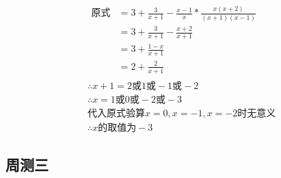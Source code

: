 \documentclass[answers]{exam} %
\begin{document}
\begin{questions}
\begin{parts}
    \vspace*{1in}
    \begin{solution}
      \[
        \begin{aligned}
        & \begin{aligned}
          \mbox{原式} &= 3 + \frac{3}{x+1} - \frac{x-1}{x} * \frac{x(x+2)}{(x+1)(x-1)} \\
          &= 3 + \frac{3}{x+1} - \frac{x+2}{x+1} \\
          &= 3 + \frac{1-x}{x+1} \\
          &= 2 + \frac{2}{x+1}
        \end{aligned} \\
        & \therefore x + 1 = 2 \mbox{或} 1 \mbox{或} -1 \mbox{或} -2 \\
        & \therefore x = 1 \mbox{或} 0 \mbox{或} -2 \mbox{或} -3 \\
        & \mbox{代入原式验算} x = 0, x = -1, x = -2 \mbox{时无意义} \\
        & \therefore x \mbox{的取值为} -3
        \end{aligned}
      \]
    \end{solution}
    
  \end{parts}
  
\end{questions}

\subsection{周测三}
\end{document}
